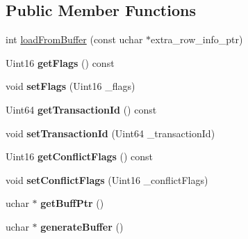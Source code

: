 \subsection*{Public Member Functions}
\begin{DoxyCompactItemize}
\item 
int \mbox{\hyperlink{classNdb__binlog__extra__row__info_a5bbe4660bdabf94c12fe396c07803df3}{load\+From\+Buffer}} (const uchar $\ast$extra\+\_\+row\+\_\+info\+\_\+ptr)
\item 
\mbox{\label{classNdb__binlog__extra__row__info_aa13eaf343562036427cc9d330abfcb78}} 
Uint16 {\bfseries get\+Flags} () const
\item 
\mbox{\label{classNdb__binlog__extra__row__info_adb3a1e01979aa8e9f4b92de34fd8701e}} 
void {\bfseries set\+Flags} (Uint16 \+\_\+flags)
\item 
\mbox{\label{classNdb__binlog__extra__row__info_a48700a67040b89f72de5009cb7dde138}} 
Uint64 {\bfseries get\+Transaction\+Id} () const
\item 
\mbox{\label{classNdb__binlog__extra__row__info_ade470b2f72071d90fe97c6d4b33f6b70}} 
void {\bfseries set\+Transaction\+Id} (Uint64 \+\_\+transaction\+Id)
\item 
\mbox{\label{classNdb__binlog__extra__row__info_a27813bb8364e7f212cc554a2f6204120}} 
Uint16 {\bfseries get\+Conflict\+Flags} () const
\item 
\mbox{\label{classNdb__binlog__extra__row__info_a5e4e3d4cb1fdc94b911b6034c7ea5b61}} 
void {\bfseries set\+Conflict\+Flags} (Uint16 \+\_\+conflict\+Flags)
\item 
\mbox{\label{classNdb__binlog__extra__row__info_ab463c2bf86295c1de31f672babe4afb1}} 
uchar $\ast$ {\bfseries get\+Buff\+Ptr} ()
\item 
\mbox{\label{classNdb__binlog__extra__row__info_a6b27e126a779090ed6a2e2db19b7f654}} 
uchar $\ast$ {\bfseries generate\+Buffer} ()
\end{DoxyCompactItemize}
